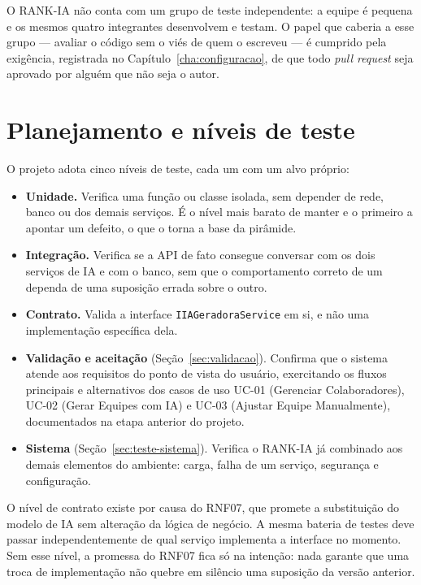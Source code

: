 \documentclass[a4paper,12pt,oneside,openany]{book}
\newif\iforientacoes
\newcommand{\orientacao}[1]{%
    \iforientacoes
        \begin{quote}
        \small\itshape\textbf{Orientação:} #1
        \end{quote}
    \fi
}
\begin{document}
O RANK-IA não conta com um grupo de teste independente: a equipe é pequena e os
mesmos quatro integrantes desenvolvem e testam. O papel que caberia a esse
grupo --- avaliar o código sem o viés de quem o escreveu --- é cumprido pela
exigência, registrada no Capítulo~\ref{cha:configuracao}, de que todo
\textit{pull request} seja aprovado por alguém que não seja o autor.

\section{Planejamento e níveis de teste}

\orientacao{Indiquem os níveis de teste aplicáveis ao projeto, por exemplo,
unidade, integração e sistema, e expliquem o objetivo de cada um deles no
contexto do software.}

O projeto adota cinco níveis de teste, cada um com um alvo próprio:

\begin{itemize}[nosep]
    \item \textbf{Unidade.} Verifica uma função ou classe isolada, sem depender
    de rede, banco ou dos demais serviços. É o nível mais barato de manter e o
    primeiro a apontar um defeito, o que o torna a base da pirâmide.
    \item \textbf{Integração.} Verifica se a API de fato consegue conversar com
    os dois serviços de IA e com o banco, sem que o comportamento correto de um
    dependa de uma suposição errada sobre o outro.
    \item \textbf{Contrato.} Valida a interface \texttt{IIAGeradoraService} em
    si, e não uma implementação específica dela.
    \item \textbf{Validação e aceitação} (Seção~\ref{sec:validacao}). Confirma
    que o sistema atende aos requisitos do ponto de vista do usuário,
    exercitando os fluxos principais e alternativos dos casos de uso UC-01
    (Gerenciar Colaboradores), UC-02 (Gerar Equipes com IA) e UC-03 (Ajustar
    Equipe Manualmente), documentados na etapa anterior do projeto.
    \item \textbf{Sistema} (Seção~\ref{sec:teste-sistema}). Verifica o RANK-IA
    já combinado aos demais elementos do ambiente: carga, falha de um serviço,
    segurança e configuração.
\end{itemize}

O nível de contrato existe por causa do RNF07, que promete a substituição do
modelo de IA sem alteração da lógica de negócio. A mesma bateria de testes deve
passar independentemente de qual serviço implementa a interface no momento. Sem
esse nível, a promessa do RNF07 fica só na intenção: nada garante que uma troca
de implementação não quebre em silêncio uma suposição da versão anterior.
\end{document}
